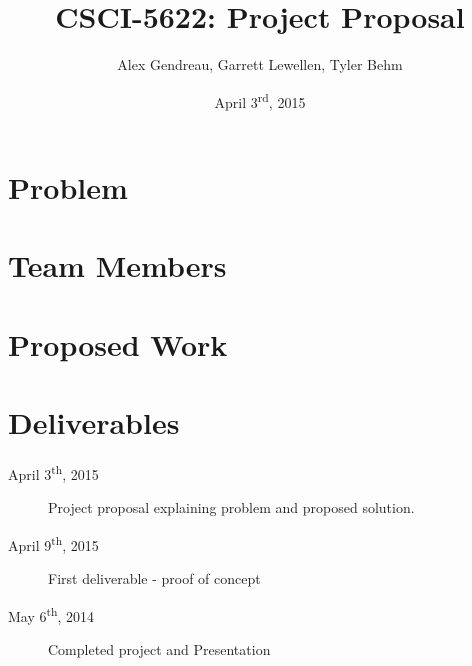 \documentclass[letterpaper]{article}
\begin{document}
\title{CSCI-5622: Project Proposal}
\author{Alex Gendreau, Garrett Lewellen, Tyler Behm}
\date{April 3\textsuperscript{rd}, 2015}

\maketitle

\section*{Problem}

\section*{Team Members}

\section*{Proposed Work}

\section*{Deliverables}

\begin{description}
\item[April 3\textsuperscript{th}, 2015] Project proposal explaining problem and proposed solution.

\item[April 9\textsuperscript{th}, 2015] First deliverable - proof of concept

\item[May 6\textsuperscript{th}, 2014] Completed project and Presentation

\end{description}
\end{document}

